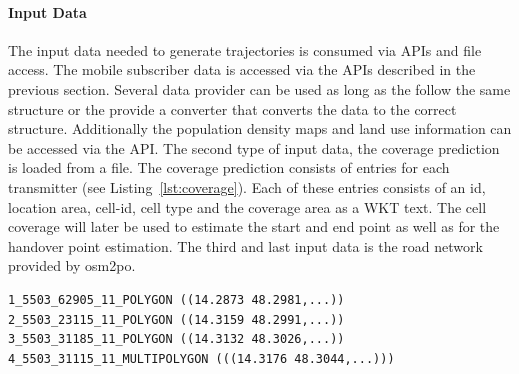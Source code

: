 \paragraph{Input Data}
The input data needed to generate trajectories is consumed via APIs and file access. The mobile subscriber data is accessed via the APIs described in the previous section. Several data provider can be used as long as the follow the same structure or the provide a converter that converts the data to the correct structure. Additionally the population density maps and land use information can be accessed via the API. The second type of input data, the coverage prediction is loaded from a file. The coverage prediction consists of entries for each transmitter (see Listing~\ref{lst:coverage}). Each of these entries consists of an id, location area, cell-id, cell type and the coverage area as a WKT text. The cell coverage will later be used to estimate the start and end point as well as for the handover point estimation. The third and last input data is the road network provided by osm2po.

\begin{lstlisting}[style=BashInputStyle,caption={Coverage prediction},label={lst:coverage}]
1_5503_62905_11_POLYGON ((14.2873 48.2981,...))
2_5503_23115_11_POLYGON ((14.3159 48.2991,...))
3_5503_31185_11_POLYGON ((14.3132 48.3026,...))
4_5503_31115_11_MULTIPOLYGON (((14.3176 48.3044,...)))
\end{lstlisting}


